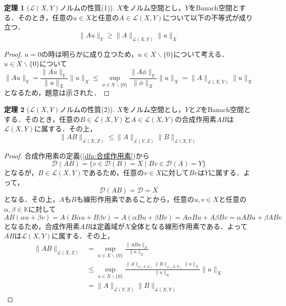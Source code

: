 \documentclass[11pt,a4paper]{jsarticle}
\theoremstyle{definition}
\newtheorem{thm}{定理}
\begin{document}
\begin{thm}[$\mathcal{L}(X,Y)$ノルムの性質(1)]
  $X$をノルム空間とし，$Y$をBanach空間とする．そのとき，任意の$u\in X$と任意の$A\in\mathcal{L}(X,Y)$について以下の不等式が成り立つ．
  \begin{equation*}
    \|Au\|_Y\geq\|A\|_{\mathcal{L}(X,Y)}\|u\|_X
  \end{equation*}
\end{thm}

\begin{proof}
  $u=0$の時は明らかに成り立つため，$u\in X\backslash\{0\}$について考える．$u\in X\backslash\{0\}$について
  \begin{equation*}
    \|Au\|_Y = \frac{\|Au\|_Y}{\|u\|_X}\|u\|_X \leq \sup_{\phi\in X\backslash \{0\}} \frac{\|A\phi\|_Y}{\|\phi\|_X}\|u\|_X = \|A\|_{\mathcal{L}(X,Y)}\|u\|_X
  \end{equation*}
  となるため，題意は示された．
\end{proof}

\begin{thm}[$\mathcal{L}(X,Y)$ノルムの性質(2)]
  \label{thm:ノルムの性質2}
  $X$をノルム空間とし，$Y$と$Z$をBanach空間とする．そのとき，任意の$B\in\mathcal{L}(X,Y)$と$A\in\mathcal{L}(X,Y)$の合成作用素$AB$は$\mathcal{L}(X,Y)$に属する．その上，
  \begin{equation*}
    \|AB\|_{\mathcal{L}(X,Z)} \leq \|A\|_{\mathcal{L}(Y,Z)}\|B\|_{\mathcal{L}(X,Y)}
  \end{equation*}
\end{thm}

\begin{proof}
  合成作用素の定義(\ref{dfn:合成作用素})から
  \begin{equation*}
    \mathcal{D}(AB)=\{v\in\mathcal{D}(B)=X \mid Bv\in\mathcal{D}(A)=Y\}
  \end{equation*}
  となるが，$B\in\mathcal{L}(X,Y)$であるため，任意の$v\in X$に対して$Bv$は$Y$に属する．よって，
  \begin{equation*}
    \mathcal{D}(AB)=\mathcal{D}=X
  \end{equation*}
  となる．その上，$A$も$B$も線形作用素であることから，任意の$u,v\in X$と任意の$\alpha,\beta\in\mathbb{K}$に対して
  \begin{equation*}
    AB(\alpha u+\beta v) = A(B\alpha u+B\beta v) = A(\alpha Bu+\beta Bv) = A\alpha Bu + A\beta Bv = \alpha ABu + \beta ABv
  \end{equation*}
  となるため，合成作用素$AB$は定義域が$X$全体となる線形作用素である．よって$AB$は$\mathcal{L}(X,Y)$に属する．その上，
  \begin{align*}
    \|AB\|_{\mathcal{L}(X,Z)} & = \sup_{u\in X\backslash \{0\}} \frac{\|ABu\|_Z}{\|u\|_X}                                                            \\
                              & \leq \sup_{u\in X\backslash \{0\}} \frac{\|A\|_{\mathcal{L}(Y,Z)} \|B\|_{\mathcal{L}(X,Y)} \|u\|_X }{\|u\|_X}\|u\|_X \\
                              & = \|A\|_{\mathcal{L}(Y,Z)} \|B\|_{\mathcal{L}(X,Y)}
  \end{align*}
\end{proof}
\end{document}
